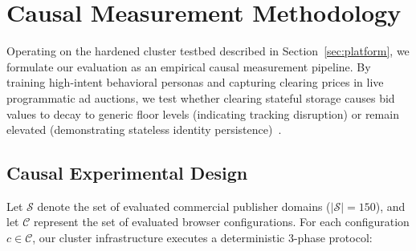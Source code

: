 \section{Causal Measurement Methodology}
\label{sec:methodology}

Operating on the hardened cluster testbed described in Section~\ref{sec:platform}, we formulate our evaluation as an empirical causal measurement pipeline. 
By training high-intent behavioral personas and capturing clearing prices in live programmatic ad auctions, we test whether clearing stateful storage causes bid values to decay to generic floor levels (indicating tracking disruption) or remain elevated (demonstrating stateless identity persistence)~\cite{castelluccia2014selling, liu2025first}.

\subsection{Causal Experimental Design}
\label{subsec:causal_design}

Let $\mathcal{S}$ denote the set of evaluated commercial publisher domains ($|\mathcal{S}| = 150$), and let $\mathcal{C}$ represent the set of evaluated browser configurations. 
For each configuration $c \in \mathcal{C}$, our cluster infrastructure executes a deterministic 3-phase protocol:


